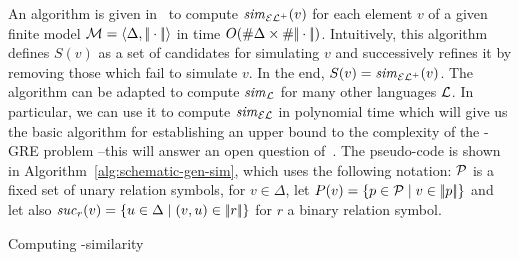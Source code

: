 An algorithm is given in~\cite{HHK95} to compute ${\it sim}_{{\mathcal{EL}^+}}(v)$ for each
element $v$ of a given finite model
$\mathcal{M}=\langle \Delta,|\!|\cdot|\!|\rangle$
in time $O(\# \Delta\times\# {|\!|\cdot|\!|})$.
Intuitively, this algorithm
defines $S(v)$ as a set of candidates for simulating $v$ and
successively refines it by removing those which fail to
simulate $v$.
In the end, $S(v)={\it sim}_{\mathcal{EL}^+}(v)$. The algorithm can be adapted to
compute ${\it sim}_{\mathcal{L}}$ for many other languages $\mathcal{L}$. In particular,
we can use it to compute ${\it sim}_\mathcal{EL}$ in polynomial time which will
give us the basic algorithm for establishing an upper bound to the
complexity of the \EL-GRE problem --this will answer an open
question of~\cite{AKS08}. The pseudo-code is shown in
Algorithm~\ref{alg:schematic-gen-sim}, which uses the following
notation: $\mathcal{P}$ is a fixed set of unary relation symbols,  for $v\in
\Delta$, let $P(v)=\{p\in\mathcal{P}\mid v\in|\!|p|\!|\}$ and let also
${\it suc}_{r}(v)=\{u\in\Delta\mid(v,u)\in|\!|r|\!|\}$ for $r$ a binary
relation symbol.

\begin{algorithm} \small
\caption{\small Computing \EL-similarity}\label{alg:schematic-gen-sim}
 \BlankLine


\end{algorithm}



